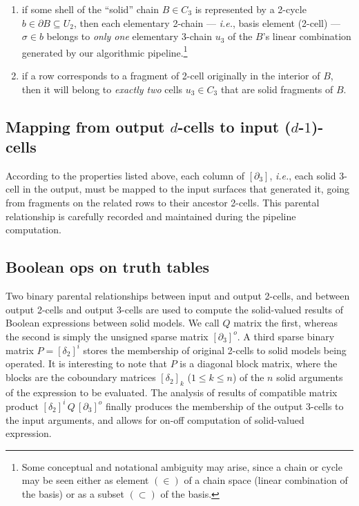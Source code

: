 \documentclass{juliacon}
\begin{document}
\begin{enumerate}
\item
if some shell of the ``solid'' chain $B\in C_3$ is represented by a 2-cycle $b\in\partial B\subseteq U_2$, then each elementary 2-chain --- \emph{i.e.}, basis element (2-cell) --- $\sigma\in b$  belongs to \emph{only one} elementary 3-chain $u_3$ of the $B$'s  linear combination  generated by our algorithmic pipeline.\footnote{Some conceptual and notational ambiguity may arise, since a chain or cycle may be seen either as element $(\in)$ of a chain space (linear combination of the basis) or as a subset $(\subset)$ of the basis.}

\item
if a row corresponds to a fragment of 2-cell originally in the interior of $B$, then it will belong to \emph{exactly two} cells $u_3\in C_3$ that are solid fragments of $B$.
\end{enumerate}



\subsection{Mapping from output $d$-cells to input ($d$-$1$)-cells}
According to the properties listed above, each column of $[\partial_3]$, \emph{i.e.}, each solid 3-cell in the output, must be mapped to the input surfaces that generated it, going from fragments on the related rows to their ancestor 2-cells. This parental relationship is carefully recorded and maintained during the pipeline computation.

\subsection{Boolean ops on truth tables}
Two binary parental relationships between input and output 2-cells, and between output 2-cells and output 3-cells are used to compute the solid-valued results of Boolean expressions between solid models. We call $Q$ matrix the first, whereas the second is simply the unsigned sparse matrix $[\partial_3]^o$. A third sparse binary matrix $P=[\delta_2]^i$ stores the membership of original 2-cells to solid models being operated.
It is interesting to note that $P$ is a diagonal block matrix, where the blocks are the coboundary matrices $[\delta_2]_k$ ($1\leq k\leq n$) of the $n$ solid arguments of the expression to be evaluated.
The analysis of results of compatible matrix product 
$
[\delta_2]^i\,Q\,[\partial_3]^o
$
 finally produces the membership of the output 3-cells to the input arguments, and allows for on-off computation of solid-valued expression.
\end{document}
